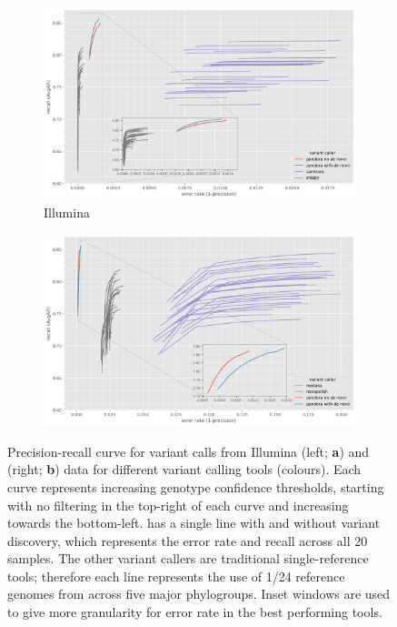 \begin{figure}
     \begin{subfigure}[b]{0.475\textwidth}
        \includegraphics[width=1\linewidth]{Chapter1/Figs/illumina_roc.png}
        \centering
        \caption{Illumina}
        \label{fig:pandora-roc-illumina}
     \end{subfigure}
     \begin{subfigure}[b]{0.475\textwidth}
         \centering
        \includegraphics[width=1\linewidth]{Chapter1/Figs/nanopore_roc.png}
         \caption{\ont{}}
         \label{fig:pandora-roc-ont}
     \end{subfigure}
    \caption{Precision-recall curve for variant calls from Illumina (left; \textbf{a}) and \ont{} (right; \textbf{b}) data for different variant calling tools (colours). Each curve represents increasing genotype confidence thresholds, starting with no filtering in the top-right of each curve and increasing towards the bottom-left. \pandora{} has a single line with and without \denovo{} variant discovery, which represents the error rate and recall across all 20 samples. The other variant callers are traditional single-reference tools; therefore each line represents the use of 1/24 reference genomes from across five major \ecoli{} phylogroups. Inset windows are used to give more granularity for error rate in the best performing tools.}
        \label{fig:pandora-roc}
\end{figure}

